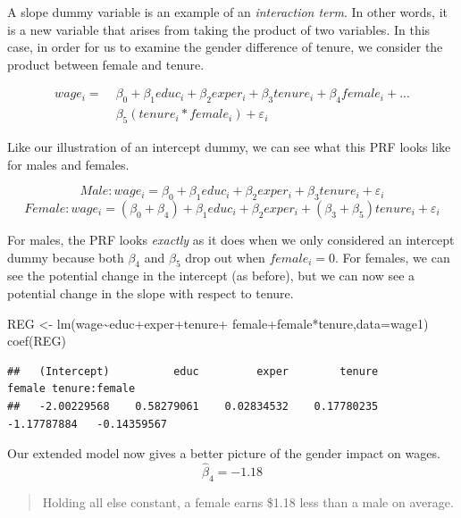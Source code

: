 \documentclass[
]{book}
\newenvironment{Shaded}{\begin{snugshade}}{\end{snugshade}}
\newcommand{\AttributeTok}[1]{\textcolor[rgb]{0.77,0.63,0.00}{#1}}
\newcommand{\FunctionTok}[1]{\textcolor[rgb]{0.00,0.00,0.00}{#1}}
\newcommand{\NormalTok}[1]{#1}
\newcommand{\OtherTok}[1]{\textcolor[rgb]{0.56,0.35,0.01}{#1}}
\newcommand{\SpecialCharTok}[1]{\textcolor[rgb]{0.00,0.00,0.00}{#1}}
\begin{document}
A slope dummy variable is an example of an \emph{interaction term}. In other words, it is a new variable that arises from taking the product of two variables. In this case, in order for us to examine the gender difference of tenure, we consider the product between female and tenure.

\[\begin{aligned}
wage_i = \;&\beta_0+\beta_1educ_i+\beta_2exper_i+ \beta_3tenure_i+\beta_4female_i+... \\ &\beta_5(tenure_i*female_i)+\varepsilon_i 
\end{aligned}\]

Like our illustration of an intercept dummy, we can see what this PRF looks like for males and females.

\[Male: wage_i=\beta_0+\beta_1educ_i+\beta_2exper_i+\beta_3tenure_i+\varepsilon_i\]
\[Female: wage_i=(\beta_0+\beta_4)+\beta_1educ_i+\beta_2exper_i+(\beta_3+\beta_5)tenure_i+\varepsilon_i\]

For males, the PRF looks \emph{exactly} as it does when we only considered an intercept dummy because both \(\beta_4\) and \(\beta_5\) drop out when \(female_i = 0\). For females, we can see the potential change in the intercept (as before), but we can now see a potential change in the slope with respect to tenure.

\begin{Shaded}
\begin{Highlighting}[]
\NormalTok{REG }\OtherTok{\textless{}{-}} \FunctionTok{lm}\NormalTok{(wage}\SpecialCharTok{\textasciitilde{}}\NormalTok{educ}\SpecialCharTok{+}\NormalTok{exper}\SpecialCharTok{+}\NormalTok{tenure}\SpecialCharTok{+}
\NormalTok{            female}\SpecialCharTok{+}\NormalTok{female}\SpecialCharTok{*}\NormalTok{tenure,}\AttributeTok{data=}\NormalTok{wage1)}
\FunctionTok{coef}\NormalTok{(REG)}
\end{Highlighting}
\end{Shaded}

\begin{verbatim}
##   (Intercept)          educ         exper        tenure        female tenure:female 
##   -2.00229568    0.58279061    0.02834532    0.17780235   -1.17787884   -0.14359567
\end{verbatim}

Our extended model now gives a better picture of the gender impact on wages.
\[\hat{\beta}_4 = -1.18\]

\begin{quote}
Holding all else constant, a female earns \$1.18 less than a male on average.
\end{quote}
\end{document}
